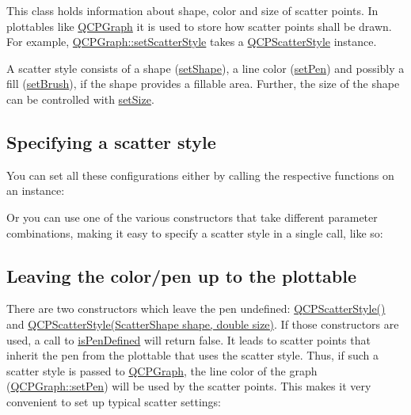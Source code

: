 This class holds information about shape, color and size of scatter points. In plottables like \hyperlink{class_q_c_p_graph}{Q\+C\+P\+Graph} it is used to store how scatter points shall be drawn. For example, \hyperlink{class_q_c_p_graph_a12bd17a8ba21983163ec5d8f42a9fea5}{Q\+C\+P\+Graph\+::set\+Scatter\+Style} takes a \hyperlink{class_q_c_p_scatter_style}{Q\+C\+P\+Scatter\+Style} instance.

A scatter style consists of a shape (\hyperlink{class_q_c_p_scatter_style_a7c641c4d4c6d29cb705d3887cfce91c1}{set\+Shape}), a line color (\hyperlink{class_q_c_p_scatter_style_a761f1f229cc0ca4703e1e2b89f6dd1ba}{set\+Pen}) and possibly a fill (\hyperlink{class_q_c_p_scatter_style_a74d692aaeb8d4b36d6f7d510e44264b1}{set\+Brush}), if the shape provides a fillable area. Further, the size of the shape can be controlled with \hyperlink{class_q_c_p_scatter_style_aaefdd031052892c4136129db68596e0f}{set\+Size}.\hypertarget{class_q_c_p_scatter_style_QCPScatterStyle-defining}{}\subsection{Specifying a scatter style}\label{class_q_c_p_scatter_style_QCPScatterStyle-defining}
You can set all these configurations either by calling the respective functions on an instance\+: 
\begin{DoxyCodeInclude}
\end{DoxyCodeInclude}
 Or you can use one of the various constructors that take different parameter combinations, making it easy to specify a scatter style in a single call, like so\+: 
\begin{DoxyCodeInclude}
\end{DoxyCodeInclude}
 \hypertarget{class_q_c_p_scatter_style_QCPScatterStyle-undefinedpen}{}\subsection{Leaving the color/pen up to the plottable}\label{class_q_c_p_scatter_style_QCPScatterStyle-undefinedpen}
There are two constructors which leave the pen undefined\+: \hyperlink{class_q_c_p_scatter_style_a8836018d9ad83ccd8870de8315c1be73}{Q\+C\+P\+Scatter\+Style()} and \hyperlink{class_q_c_p_scatter_style_a003d92f74f4561eda111862eadd62f28}{Q\+C\+P\+Scatter\+Style(\+Scatter\+Shape shape, double size)}. If those constructors are used, a call to \hyperlink{class_q_c_p_scatter_style_a7f1385a8d5e4f349a6b8030723fbd0f7}{is\+Pen\+Defined} will return false. It leads to scatter points that inherit the pen from the plottable that uses the scatter style. Thus, if such a scatter style is passed to \hyperlink{class_q_c_p_graph}{Q\+C\+P\+Graph}, the line color of the graph (\hyperlink{class_q_c_p_abstract_plottable_ab74b09ae4c0e7e13142fe4b5bf46cac7}{Q\+C\+P\+Graph\+::set\+Pen}) will be used by the scatter points. This makes it very convenient to set up typical scatter settings\+:


